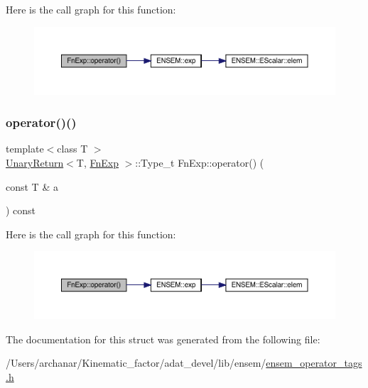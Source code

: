 Here is the call graph for this function\+:
\nopagebreak
\begin{figure}[H]
\begin{center}
\leavevmode
\includegraphics[width=350pt]{d3/d99/structFnExp_a42b9ce4950a3772fe907b8da3497267e_cgraph}
\end{center}
\end{figure}
\mbox{\label{structFnExp_a42b9ce4950a3772fe907b8da3497267e}} 
\subsubsection{\texorpdfstring{operator()()}{operator()()}\hspace{0.1cm}{\footnotesize\ttfamily [2/2]}}
{\footnotesize\ttfamily template$<$class T $>$ \\
\mbox{\hyperlink{structUnaryReturn}{Unary\+Return}}$<$T, \mbox{\hyperlink{structFnExp}{Fn\+Exp}} $>$\+::Type\+\_\+t Fn\+Exp\+::operator() (\begin{DoxyParamCaption}\item[{const T \&}]{a }\end{DoxyParamCaption}) const\hspace{0.3cm}{\ttfamily [inline]}}

Here is the call graph for this function\+:
\nopagebreak
\begin{figure}[H]
\begin{center}
\leavevmode
\includegraphics[width=350pt]{d3/d99/structFnExp_a42b9ce4950a3772fe907b8da3497267e_cgraph}
\end{center}
\end{figure}


The documentation for this struct was generated from the following file\+:\begin{DoxyCompactItemize}
\item 
/\+Users/archanar/\+Kinematic\+\_\+factor/adat\+\_\+devel/lib/ensem/\mbox{\hyperlink{lib_2ensem_2ensem__operator__tags_8h}{ensem\+\_\+operator\+\_\+tags.\+h}}\end{DoxyCompactItemize}
